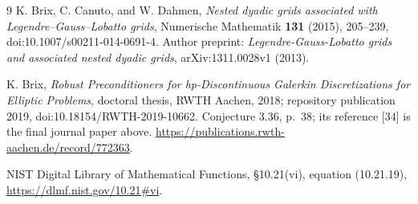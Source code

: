 \documentclass[11pt]{article}
\begin{document}
\begin{thebibliography}{9}
K. Brix, C. Canuto, and W. Dahmen,
\emph{Nested dyadic grids associated with Legendre--Gauss--Lobatto grids},
Numerische Mathematik \textbf{131} (2015), 205--239,
doi:10.1007/s00211-014-0691-4.
Author preprint: \emph{Legendre-Gauss-Lobatto grids and associated nested
dyadic grids}, arXiv:1311.0028v1 (2013).

K. Brix, \emph{Robust Preconditioners for hp-Discontinuous Galerkin
Discretizations for Elliptic Problems}, doctoral thesis, RWTH Aachen,
2018; repository publication 2019, doi:10.18154/RWTH-2019-10662.
Conjecture 3.36, p.~38; its reference [34] is the final journal paper above.
\url{https://publications.rwth-aachen.de/record/772363}.

NIST Digital Library of Mathematical Functions,
\S10.21(vi), equation (10.21.19),
\url{https://dlmf.nist.gov/10.21#vi}.
\end{thebibliography}
\end{document}

